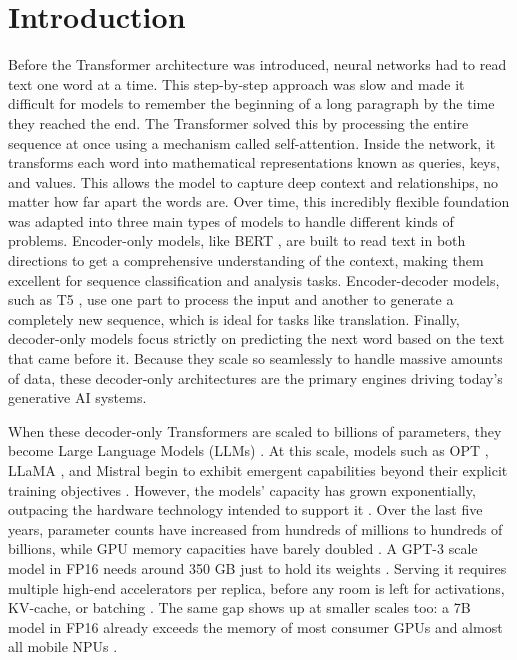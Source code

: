 \chapter{Introduction}
\hspace{3mm}

Before the Transformer architecture \cite{attention_paper} was introduced, neural networks had to read text one word at a time. This step-by-step approach was slow and made it difficult for models to remember the beginning of a long paragraph by the time they reached the end. The Transformer solved this by processing the entire sequence at once using a mechanism called self-attention. Inside the network, it transforms each word into mathematical representations known as queries, keys, and values. This allows the model to capture deep context and relationships, no matter how far apart the words are. Over time, this incredibly flexible foundation was adapted into three main types of models to handle different kinds of problems. Encoder-only models, like BERT \cite{bert_paper}, are built to read text in both directions to get a comprehensive understanding of the context, making them excellent for sequence classification and analysis tasks. Encoder-decoder models, such as T5 \cite{t5_paper}, use one part to process the input and another to generate a completely new sequence, which is ideal for tasks like translation. Finally, decoder-only models \cite{gpt3_paper} focus strictly on predicting the next word based on the text that came before it. Because they scale so seamlessly to handle massive amounts of data, these decoder-only architectures are the primary engines driving today's generative AI systems.

When these decoder-only Transformers are scaled to billions of parameters, they become Large Language Models (LLMs) \cite{gpt3_paper}. At this scale, models such as OPT \cite{opt_paper}, LLaMA \cite{llama_paper}, and Mistral \cite{mistral_paper} begin to exhibit emergent capabilities beyond their explicit training objectives \cite{gpt3_paper}. However, the models' capacity has grown exponentially, outpacing the hardware technology intended to support it \cite{zeroquant_paper, smoothquant_paper, awq_paper}. Over the last five years, parameter counts have increased from hundreds of millions to hundreds of billions, while GPU memory capacities have barely doubled \cite{llm_int8_paper, smoothquant_paper}. A GPT-3 scale model in FP16 needs around 350 GB just to hold its weights \cite{gptq_paper, zeroquant_paper}. Serving it requires multiple high-end accelerators per replica, before any room is left for activations, KV-cache, or batching \cite{llm_int8_paper}. The same gap shows up at smaller scales too: a 7B model in FP16 already exceeds the memory of most consumer GPUs and almost all mobile NPUs \cite{awq_paper, gptq_paper}.

